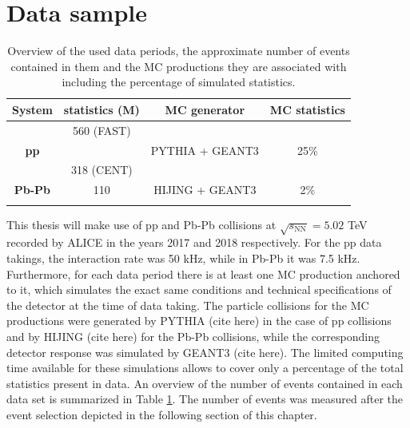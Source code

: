 \documentclass[12pt,a4paper]{report}
\begin{document}
\section{Data sample}
\begin{table}[tb!]
\centering
\renewcommand{\arraystretch}{1.5}
\begin{tabular}{c|c|c|c}
\toprule
\rowcolor{headerBlue} \textbf{System} & \textbf{statistics}  \textbf{(M)} & \textbf{MC generator} &  \textbf{MC statistics } \\
\midrule
             & 560 (FAST) & & \\
\textbf{pp}	 &	 &   PYTHIA + GEANT3  & 25\%  	 \\
 &  318 (CENT)   &  	\\
\hline
\textbf{Pb-Pb} & 110 &  HIJING + GEANT3  & 2\% \\
				 &	   & 		 \\
\bottomrule
\end{tabular}
\caption{Overview of the used data periods, the approximate number of events contained in them and the MC productions they are associated with including the percentage of simulated statistics.}
\label{tab:Periods}
\end{table} 
This thesis will make use of pp and Pb-Pb collisions at $\sqrt{s_\text{NN}}= 5.02$ TeV recorded by ALICE in the years 2017 and 2018 respectively. For the pp data takings, the interaction rate was 50 kHz, while in Pb-Pb it was 7.5 kHz. Furthermore, for each data period there is at least one MC production anchored to it, which simulates the exact same conditions and technical specifications of the detector at the time of data taking. The particle collisions for the MC productions were generated by PYTHIA (cite here) in the case of pp collisions and by HIJING (cite here) for the Pb-Pb collisions, while the corresponding detector response was simulated by GEANT3 (cite here). The limited computing time available for these simulations allows to cover only a percentage of the total statistics present in data. An overview of the number of events contained in each data set is summarized in Table \ref{tab:Periods}. The number of events was measured after the event selection depicted in the following section of this chapter.\\
\end{document}
